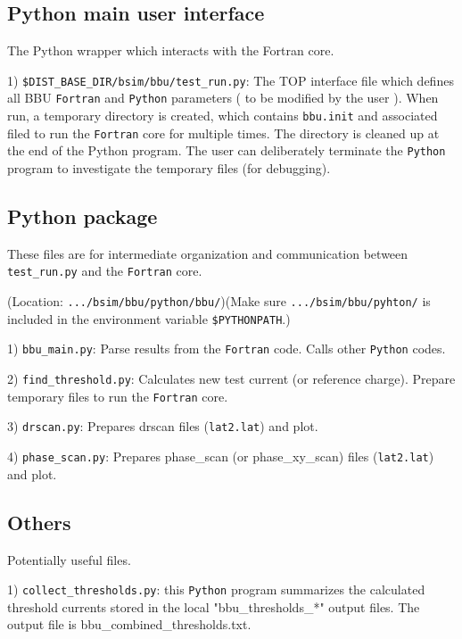 \documentclass{hitec}
\begin{document}
\subsection{ Python main user interface }
The Python wrapper which interacts with the Fortran core.

1) \texttt{\$DIST_BASE_DIR/bsim/bbu/test_run.py}: 
The TOP interface file which defines all BBU \texttt{Fortran} and \texttt{Python} parameters ( to be modified by the user ).
When run, a temporary directory is created, which contains \texttt{bbu.init} and associated filed to run the \texttt{Fortran} core for multiple times. The directory is cleaned up at the end of the Python program. The user can deliberately terminate the \texttt{Python} program to investigate the temporary files (for debugging).


\subsection{Python package}
These files are for intermediate  organization and communication between \texttt{test_run.py} and the \texttt{Fortran} core.

(Location: \texttt{.../bsim/bbu/python/bbu/})(Make sure \texttt{.../bsim/bbu/pyhton/} is included in the environment variable \texttt{\$PYTHONPATH}.)

1) \texttt{bbu_main.py}: Parse results from the \texttt{Fortran} code. Calls other \texttt{Python} codes.

2) \texttt{find_threshold.py}: Calculates new test current (or reference charge). Prepare temporary files to run the \texttt{Fortran} core.

3) \texttt{drscan.py}: Prepares drscan files (\texttt{lat2.lat}) and plot.

4) \texttt{phase_scan.py}: Prepares phase\_scan (or phase\_xy\_scan) files (\texttt{lat2.lat}) and plot.

\subsection{Others}
Potentially useful files. 

1) \texttt{collect_thresholds.py}: this \texttt{Python} program summarizes the calculated threshold currents stored in the local "bbu\_thresholds\_*" output files. The output file is bbu\_combined\_thresholds.txt.
\end{document}
